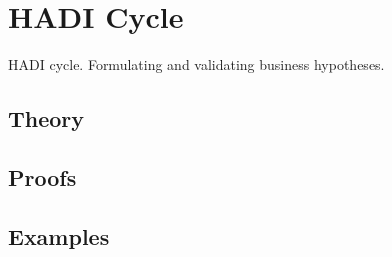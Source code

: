 
\section{HADI Cycle}
\label{sec:2.6.10-hadi-cycle}

\begin{ticket}
HADI cycle. Formulating and validating business hypotheses.
\end{ticket}

\subsection*{Theory}

\subsection*{Proofs}

\subsection*{Examples}
